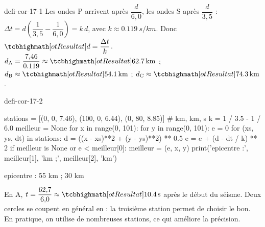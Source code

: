 \begin{blocEdition}{defi-cor-17-1}
Les ondes P arrivent après $\dfrac{d}{6{,}0}$, les ondes S après $\dfrac{d}{3{,}5}$ : $\Delta t=d\left(\dfrac{1}{3{,}5}-\dfrac{1}{6{,}0}\right)=k\,d$, avec $k\approx\qty{0,119}{s/km}$. Donc $\res{d=\dfrac{\Delta t}{k}}$.
$d_\mathrm{A}=\dfrac{7{,}46}{\num{0,119}}\approx\res{\qty{62,7}{km}}$ ; $d_\mathrm{B}\approx\res{\qty{54,1}{km}}$ ; $d_\mathrm{C}\approx\res{\qty{74,3}{km}}$.
\label{figedition-defi-cor-17-1-1}
\end{blocEdition}

\begin{blocEdition}{defi-cor-17-2}
\begin{python}
stations = [(0, 0, 7.46), (100, 0, 6.44), (0, 80, 8.85)]   # km, km, s
k = 1 / 3.5 - 1 / 6.0
meilleur = None
for x in range(0, 101):
    for y in range(0, 101):
        e = 0
        for (xs, ys, dt) in stations:
            d = ((x - xs)**2 + (y - ys)**2) ** 0.5
            e = e + (d - dt / k) ** 2
        if meilleur is None or e < meilleur[0]:
            meilleur = (e, x, y)
print('epicentre :', meilleur[1], 'km ;', meilleur[2], 'km')
\end{python}
\begin{console}
epicentre : 55 km ; 30 km
\end{console}
En A, $t=\dfrac{62{,}7}{6{,}0}\approx\res{\qty{10,4}{s}}$ après le début du séisme.
Deux cercles se coupent en général en  : la troisième station permet de choisir le bon. En pratique, on utilise
de nombreuses stations, ce qui améliore la précision.
\end{blocEdition}

